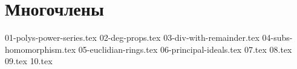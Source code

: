 \section{Многочлены}
{01-polys-power-series.tex}
{02-deg-props.tex}
{03-div-with-remainder.tex}
{04-subs-homomorphism.tex}
{05-euclidian-rings.tex}
{06-principal-ideals.tex}
{07.tex}
{08.tex}
{09.tex}
{10.tex}
